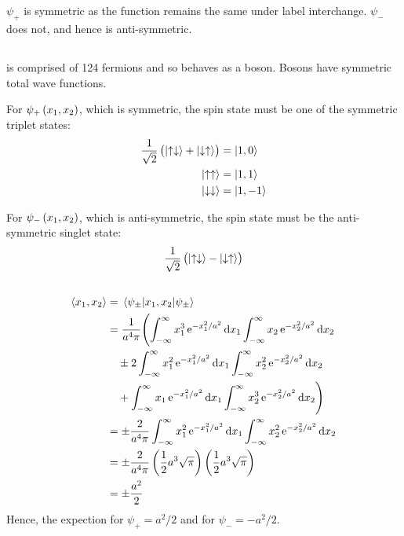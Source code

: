 \subsection{}
$ \psi_+ $ is symmetric as the function remains the same under label interchange. $ \psi_{-} $ does not, and hence is anti-symmetric.

\subsection{}
 is comprised of 124 fermions and so behaves as a boson. Bosons have symmetric total wave functions.

For $ \psi_+ \del{x_1, x_2} $, which is symmetric, the spin state must be one of the symmetric triplet states:
\begin{align*}
    \frac{1}{\sqrt{2}} \del{\ket{\uparrow \downarrow} + \ket{\downarrow \uparrow}} & = \ket{1, 0}\\
    \ket{\uparrow \uparrow} & = \ket{1, 1}\\
    \ket{\downarrow \downarrow} & = \ket{1, -1}
\end{align*}

For $ \psi_- \del{x_1, x_2} $, which is anti-symmetric, the spin state must be the anti-symmetric singlet state:
\begin{equation*}
    \frac{1}{\sqrt{2}} \del{\ket{\uparrow \downarrow} - \ket{\downarrow \uparrow}}
\end{equation*}

\subsection{}
\begin{align*}
    \expectationvalue{x_1,x_2} & = \expectationvalue{x_1,x_2}{\psi_{\pm}}\\
    & = \frac{1}{a^4 \pi} \Biggl(\int_{-\infty}^{\infty} x_1^3 \operatorname{e}^{-x_1^2/a^2} \dif x_1 \int_{-\infty}^{\infty} x_2 \operatorname{e}^{-x_2^2/a^2} \dif x_2\\
    & \quad \pm 2 \int_{-\infty}^{\infty} x_1^2 \operatorname{e}^{-x_1^2/a^2} \dif x_1 \int_{-\infty}^{\infty} x_2^2 \operatorname{e}^{-x_2^2/a^2} \dif x_2\\
    & \quad + \int_{-\infty}^{\infty} x_1 \operatorname{e}^{-x_1^2/a^2} \dif x_1 \int_{-\infty}^{\infty} x_2^3 \operatorname{e}^{-x_2^2/a^2} \dif x_2 \Biggr)\\
    & = \pm \frac{2}{a^4 \pi} \int_{-\infty}^{\infty} x_1^2 \operatorname{e}^{-x_1^2/a^2} \dif x_1 \int_{-\infty}^{\infty} x_2^2 \operatorname{e}^{-x_2^2/a^2} \dif x_2\\
    & = \pm \frac{2}{a^4 \pi} \del{\frac{1}{2} a^3 \sqrt{\pi}} \del{\frac{1}{2} a^3 \sqrt{\pi}}\\
    & = \pm \frac{a^2}{2}
\end{align*}
Hence, the expection for $ \psi_+ = a^2/2 $ and for $ \psi_- = - a^2/2 $.

